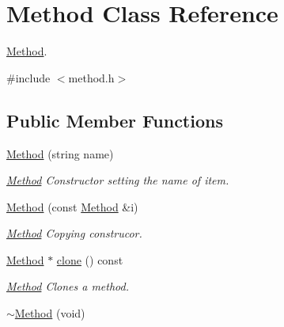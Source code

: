 \hypertarget{class_method}{\section{\-Method \-Class \-Reference}
\label{class_method}
}


\hyperlink{class_method}{\-Method}.  




{\ttfamily \#include $<$method.\-h$>$}

\subsection*{\-Public \-Member \-Functions}
\begin{DoxyCompactItemize}
\item 
\hyperlink{class_method_add7373330b451d8d52d3c5c3d9926f5b}{\-Method} (string name)
\begin{DoxyCompactList}\small\item\em \hyperlink{class_method}{\-Method} \-Constructor setting the name of item. \end{DoxyCompactList}\item 
\hypertarget{class_method_a795bb51e0831bbd8c02e102aae3e24c6}{\hyperlink{class_method_a795bb51e0831bbd8c02e102aae3e24c6}{\-Method} (const \hyperlink{class_method}{\-Method} \&i)}\label{class_method_a795bb51e0831bbd8c02e102aae3e24c6}

\begin{DoxyCompactList}\small\item\em \hyperlink{class_method}{\-Method} \-Copying construcor. \end{DoxyCompactList}\item 
\hypertarget{class_method_a57b88c5c3223f1ba41db4f15670df252}{\hyperlink{class_method}{\-Method} $\ast$ \hyperlink{class_method_a57b88c5c3223f1ba41db4f15670df252}{clone} () const }\label{class_method_a57b88c5c3223f1ba41db4f15670df252}

\begin{DoxyCompactList}\small\item\em \hyperlink{class_method}{\-Method} \-Clones a method. \end{DoxyCompactList}\item 
\hypertarget{class_method_aabf25ecc3e11667460249d347e498d2c}{\hyperlink{class_method_aabf25ecc3e11667460249d347e498d2c}{$\sim$\-Method} (void)}\label{class_method_aabf25ecc3e11667460249d347e498d2c}


\end{DoxyCompactItemize}
